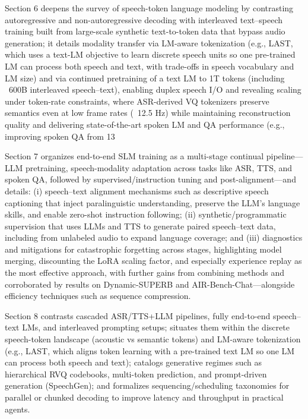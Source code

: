 \documentclass{article}
\begin{document}
Section 6 deepens the survey of speech-token language modeling by contrasting autoregressive and non-autoregressive decoding with interleaved text--speech training built from large-scale synthetic text-to-token data that bypass audio generation; it details modality transfer via LM-aware tokenization (e.g., LAST, which uses a text-LM objective to learn discrete speech units so one pre-trained LM can process both speech and text, with trade-offs in speech vocabulary and LM size) and via continued pretraining of a text LM to 1T tokens (including ~600B interleaved speech--text), enabling duplex speech I/O and revealing scaling under token-rate constraints, where ASR-derived VQ tokenizers preserve semantics even at low frame rates (~12.5 Hz) while maintaining reconstruction quality and delivering state-of-the-art spoken LM and QA performance (e.g., improving spoken QA from 13%



Section 7 organizes end-to-end SLM training as a multi-stage continual pipeline---LLM pretraining, speech-modality adaptation across tasks like ASR, TTS, and spoken QA, followed by supervised/instruction tuning and post-alignment---and details: (i) speech--text alignment mechanisms such as descriptive speech captioning that inject paralinguistic understanding, preserve the LLM's language skills, and enable zero-shot instruction following; (ii) synthetic/programmatic supervision that uses LLMs and TTS to generate paired speech--text data, including from unlabeled audio to expand language coverage; and (iii) diagnostics and mitigations for catastrophic forgetting across stages, highlighting model merging, discounting the LoRA scaling factor, and especially experience replay as the most effective approach, with further gains from combining methods and corroborated by results on Dynamic-SUPERB and AIR-Bench-Chat---alongside efficiency techniques such as sequence compression. \cite{noroozi2024instructiondatagenerationunsupervisedada,hsiao2025analyzingmitigationstrategiescatastrophi,lu2024destaenhancingspeechlanguagemodelsthroug,lu2025desta2developinginstructionfollowingspee} 



Section 8 contrasts cascaded ASR/TTS+LLM pipelines, fully end-to-end speech--text LMs, and interleaved prompting setups; situates them within the discrete speech-token landscape (acoustic vs semantic tokens) and LM-aware tokenization (e.g., LAST, which aligns token learning with a pre-trained text LM so one LM can process both speech and text); catalogs generative regimes such as hierarchical RVQ codebooks, multi-token prediction, and prompt-driven generation (SpeechGen); and formalizes sequencing/scheduling taxonomies for parallel or chunked decoding to improve latency and throughput in practical agents. \cite{turetzky2024lastlanguagemodelawarespeechtokenization,wu2023speechgenunlockinggenerativepowerspeechl,guo2025recentadvancesdiscretespeechtokensreview} 
\end{document}
